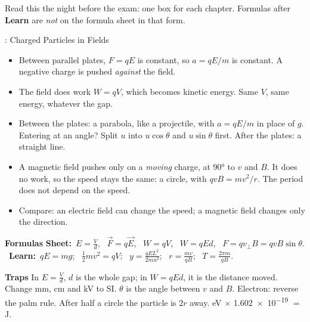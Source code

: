 
Read this the night before the exam: one box for each chapter. Formulas after
\textcolor{hscmistake}{\bfseries Learn} are \emph{not} on the formula sheet in that form.

\newcommand\sumhead[1]{\par{\bfseries\color{hscbrand}#1}\enspace}
\newcommand\sumLearn{{\bfseries\color{hscmistake}Learn:}}
\newcommand\sumSheet{{\bfseries\color{hscformula}Sheet:}}

\begin{summarybox}[fontupper=\small]{: Charged Particles in Fields}
\begin{itemize}[itemsep=0pt, topsep=0pt]
  \item Between parallel plates, $F = qE$ is constant, so $a = qE/m$ is constant. A negative
        charge is pushed \emph{against} the field.
  \item The field does work $W = qV$, which becomes kinetic energy. Same $V$, same energy,
        whatever the gap.
  \item Between the plates: a parabola, like a projectile, with $a = qE/m$ in place of $g$.
        Entering at an angle? Split $u$ into $u\cos\theta$ and $u\sin\theta$ first. After
        the plates: a straight line.
  \item A magnetic field pushes only on a \emph{moving} charge, at \ang{90} to $v$ and $B$.
        It does no work, so the speed stays the same: a circle, with $qvB = mv^2/r$. The
        period does not depend on the speed.
  \item Compare: an electric field can change the speed; a magnetic field changes only the
        direction.
\end{itemize}
\sumhead{Formulas} \sumSheet\ $E = \frac{V}{d}$, \ $\vec{F} = q\vec{E}$, \ $W = qV$, \
$W = qEd$, \ $F = qv_\perp B = qvB\sin\theta$. \ \sumLearn\ $qE = mg$; \
$\frac{1}{2}mv^2 = qV$; \ $y = \frac{qEL^2}{2mu^2}$; \ $r = \frac{mv}{qB}$; \
$T = \frac{2\pi m}{qB}$.
\sumhead{Traps} In $E = \frac{V}{d}$, $d$ is the whole gap; in $W = qEd$, it is the
distance moved. Change mm, cm and kV to SI. $\theta$ is the angle between $v$ and $B$.
Electron: reverse the palm rule. After half a circle the particle is $2r$ away. eV $\times$ \num{1.602e-19} $=$ J.
\end{summarybox}

